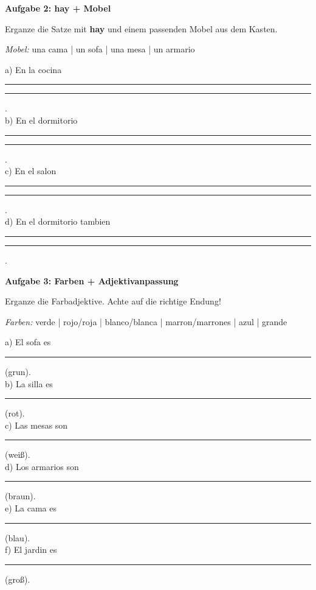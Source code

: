 \documentclass[11pt, a4paper]{article}
\newcommand{\fachfarbe}{spanisch}
\newcommand{\punktebox}[1]{\hfill\fbox{\small \_/#1}}
\newcommand{\luecke}[1]{\rule{#1}{0.4pt}}
\newenvironment{aufgabe}[1]{%
    \needspace{5\baselineskip}%
    \nopagebreak[4]%
    \vspace{10pt}
    \noindent\textbf{\textcolor{\fachfarbe}{Aufgabe #1}}
    \nopagebreak[4]%
    \vspace{5pt}
    \nopagebreak[4]%
    \begin{list}{}{\leftmargin=0pt}
    \item[]
}{%
    \end{list}
}
\newcommand{\es}[1]{\textcolor{\fachfarbe}{\textbf{#1}}}
\begin{document}

\begin{aufgabe}{2: hay + Mobel}
Erganze die Satze mit \es{hay} und einem passenden Mobel aus dem Kasten. \punktebox{4}
\end{aufgabe}

\begin{vokabelkasten}
\textit{Mobel:} una cama | un sofa | una mesa | un armario
\end{vokabelkasten}

\vspace{0.5em}

\noindent
a) En la cocina \luecke{4cm} \luecke{3cm}. \\[1em]
b) En el dormitorio \luecke{4cm} \luecke{3cm}. \\[1em]
c) En el salon \luecke{4cm} \luecke{3cm}. \\[1em]
d) En el dormitorio tambien \luecke{4cm} \luecke{3cm}. \\

\vspace{15pt}


\begin{aufgabe}{3: Farben + Adjektivanpassung}
Erganze die Farbadjektive. Achte auf die richtige Endung! \punktebox{6}
\end{aufgabe}

\begin{vokabelkasten}
\textit{Farben:} verde | rojo/roja | blanco/blanca | marron/marrones | azul | grande
\end{vokabelkasten}

\vspace{0.5em}

\noindent
a) El sofa es \luecke{3cm} (grun). \\[1em]
b) La silla es \luecke{3cm} (rot). \\[1em]
c) Las mesas son \luecke{3cm} (weiß). \\[1em]
d) Los armarios son \luecke{3cm} (braun). \\[1em]
e) La cama es \luecke{3cm} (blau). \\[1em]
f) El jardin es \luecke{3cm} (groß). \\
\end{document}
